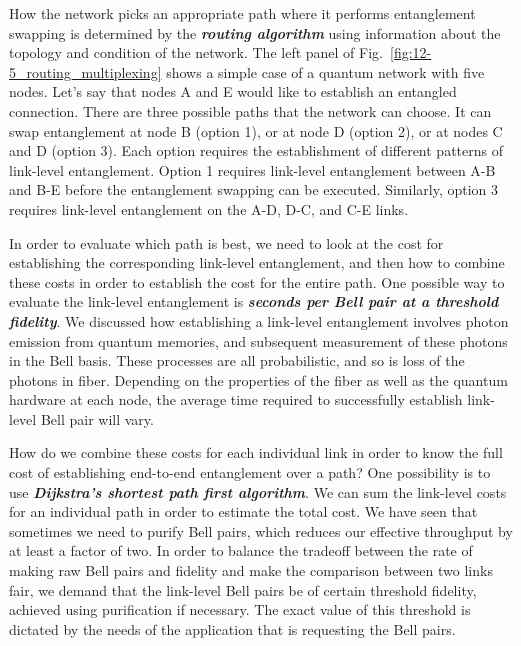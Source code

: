 How the network picks an appropriate path where it performs entanglement swapping is determined by the \emph{\textbf{routing algorithm}} using information about the topology and condition of the network.
The left panel of Fig.~\ref{fig:12-5_routing_multiplexing} shows a simple case of a quantum network with five nodes.
Let's say that nodes A and E would like to establish an entangled connection.
There are three possible paths that the network can choose.
It can swap entanglement at node B (option 1), or at node D (option 2), or at nodes C and D (option 3).
Each option requires the establishment of different patterns of link-level entanglement.
Option 1 requires link-level entanglement between A-B and B-E before the entanglement swapping can be executed.
Similarly, option 3 requires link-level entanglement on the A-D, D-C, and C-E links.

In order to evaluate which path is best, we need to look at the cost for establishing the corresponding link-level entanglement, and then how to combine these costs in order to establish the cost for the entire path.
One possible way to evaluate the link-level entanglement is \emph{\textbf{seconds per Bell pair at a threshold fidelity}}.
We discussed how establishing a link-level entanglement involves photon emission from quantum memories, and subsequent measurement of these photons in the Bell basis.
These processes are all probabilistic, and so is loss of the photons in fiber.
Depending on the properties of the fiber as well as the quantum hardware at each node, the average time required to successfully establish link-level Bell pair will vary.

How do we combine these costs for each individual link in order to know the full cost of establishing end-to-end entanglement over a path?
One possibility is to use \emph{\textbf{Dijkstra's shortest path first algorithm}}\label{dijkstra}.
We can sum the link-level costs for an individual path in order to estimate the total cost.
We have seen that sometimes we need to purify Bell pairs, which reduces our effective throughput by at least a factor of two.
In order to balance the tradeoff between the rate of making raw Bell pairs and fidelity and make the comparison between two links fair, we demand that the link-level Bell pairs be of certain threshold fidelity, achieved using purification if necessary.
The exact value of this threshold is dictated by the needs of the application that is requesting the Bell pairs.

